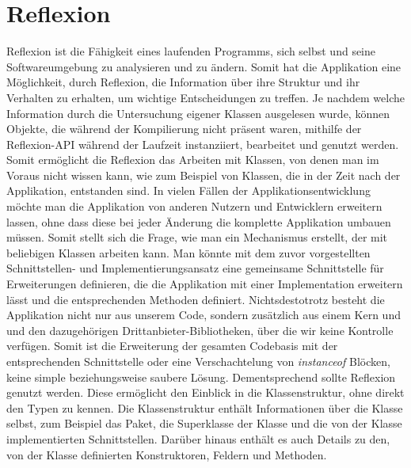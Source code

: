 \section{Reflexion}\label{sec:refl}
  Reflexion ist die Fähigkeit eines laufenden Programms, sich selbst und seine Softwareumgebung zu analysieren und zu ändern. 
  Somit hat die Applikation eine Möglichkeit, durch Reflexion, die Information über ihre Struktur und ihr Verhalten zu erhalten, um wichtige Entscheidungen zu treffen. Je nachdem welche Information durch die Untersuchung eigener Klassen ausgelesen wurde, können Objekte, die während der Kompilierung nicht präsent waren, mithilfe der Reflexion-API während der Laufzeit instanziiert, bearbeitet und genutzt werden. Somit ermöglicht die Reflexion das Arbeiten mit Klassen, von denen man im Voraus nicht wissen kann, wie zum Beispiel von Klassen, die in der Zeit nach der Applikation, entstanden sind.\bigbreak 
  In vielen Fällen der Applikationsentwicklung möchte man die Applikation von anderen Nutzern und Entwicklern erweitern lassen, ohne dass diese bei jeder Änderung die komplette Applikation umbauen müssen. Somit stellt sich die Frage, wie man ein Mechanismus erstellt, der mit beliebigen Klassen arbeiten kann.\newline
  Man könnte mit dem zuvor vorgestellten Schnittstellen- und Implementierungsansatz eine gemeinsame Schnittstelle für Erweiterungen definieren, die die Applikation mit einer Implementation erweitern lässt und die entsprechenden Methoden definiert. Nichtsdestotrotz besteht die Applikation nicht nur aus unserem Code, sondern zusätzlich aus einem Kern und und den dazugehörigen Drittanbieter-Bibliotheken, über die wir keine Kontrolle verfügen. Somit ist die Erweiterung der gesamten Codebasis mit der entsprechenden Schnittstelle oder eine Verschachtelung von \textit{instanceof} Blöcken, keine simple beziehungsweise saubere Lösung. Dementsprechend sollte Reflexion genutzt werden. Diese ermöglicht den Einblick in die Klassenstruktur, ohne direkt den Typen zu kennen. Die Klassenstruktur enthält Informationen über die Klasse selbst, zum Beispiel das Paket, die Superklasse der Klasse und die von der Klasse implementierten Schnittstellen. Darüber hinaus enthält es auch Details zu den, von der Klasse definierten Konstruktoren, Feldern und Methoden.\bigbreak

